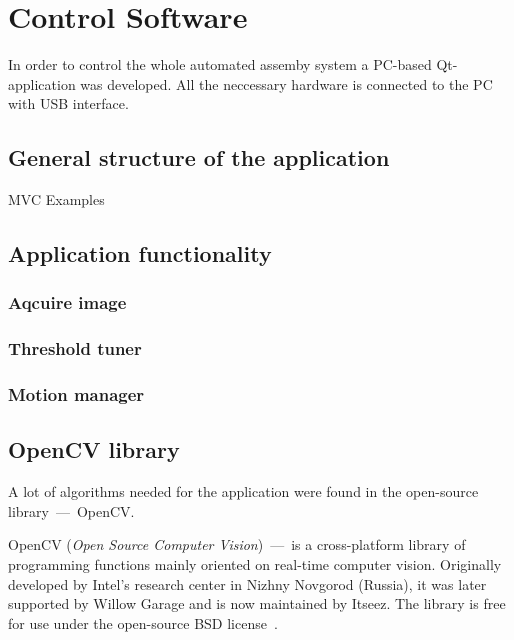 \chapter{Control Software}

In order to control the whole automated assemby system a PC-based Qt-application was developed. All the neccessary hardware is connected to the PC with USB interface.

\section{General structure of the application}

MVC
Examples

\section{Application functionality}

\subsection{Aqcuire image}

\subsection{Threshold tuner}

\subsection{Motion manager}

\section{OpenCV library}

A lot of algorithms needed for the application were found in the open-source library~---~OpenCV.

OpenCV (\textit{Open Source Computer Vision})~---~is a cross-platform library of programming functions mainly oriented on real-time computer vision. Originally developed by Intel's research center in Nizhny Novgorod (Russia), it was later supported by Willow Garage and is now maintained by Itseez. The library is free for use under the open-source BSD license~\cite{Reference3}.

